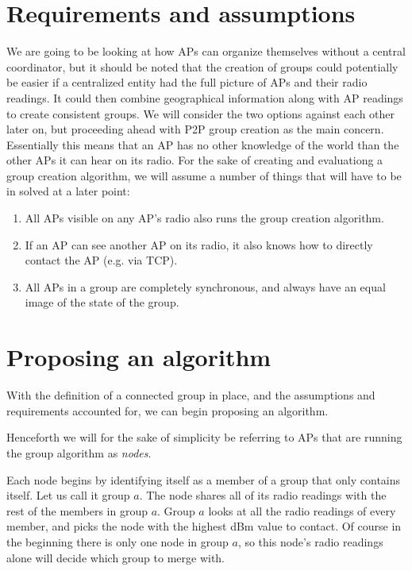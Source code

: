 \section{Requirements and assumptions}
We are going to be looking at how APs can organize themselves without a central coordinator,
but it should be noted that the creation of groups could potentially be easier if
a centralized entity had the full picture of APs and their radio readings.
It could then combine geographical information along with AP readings to create consistent groups.
We will consider the two options against each other later on,
but proceeding ahead with P2P group creation as the main concern. 
Essentially this means that an AP has no other knowledge of the world than the other APs
it can hear on its radio. For the sake of creating and evaluationg a group creation algorithm,
we will assume a number of things that will have to be in solved at a later point:

    \begin{enumerate}
    \item All APs visible on any AP's radio also runs the group creation algorithm.
    \item If an AP can see another AP on its radio, it also knows how to directly contact the AP (e.g. via TCP).
    \item All APs in a group are completely synchronous, and always have an equal image of the state of the group. 
    \end{enumerate}

\section{Proposing an algorithm}\label{algorithm}
With the definition of a connected group in place, and the assumptions and requirements accounted for, we can begin proposing an algorithm.

Henceforth we will for the sake of simplicity be referring to APs that are running the group algorithm as \textit{nodes}.

Each node begins by identifying itself as a member of a group that only contains itself. Let us call it group $a$. The node shares all of
its radio readings with the rest of the members in group $a$. Group $a$ looks at all the radio readings of every member, and picks the node with the highest dBm value
to contact. Of course in the beginning there is only one node in group $a$, so this node's radio readings alone will decide which group to merge with. 

